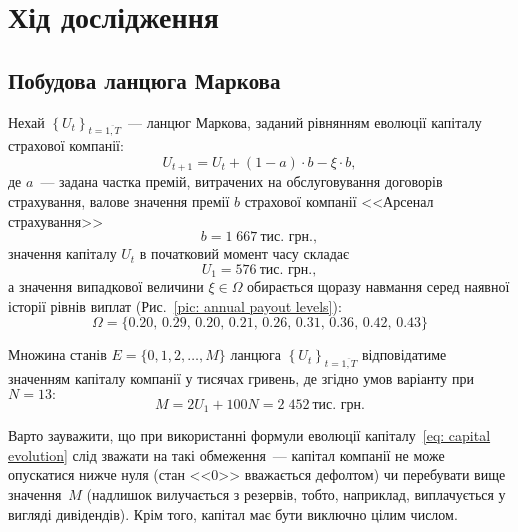 \documentclass{mathreport}
\begin{document}
\section*{Хід дослідження}

\subsection{Побудова ланцюга Маркова}

Нехай $\left\{ U_t \right\}_{t=\overline{1,T}}$~--- ланцюг Маркова, заданий рівнянням еволюції капіталу страхової компанії:
\begin{equation}\label{eq: capital evolution}
    U_{t+1} = U_{t} + (1-a) \cdot b - \xi \cdot b,
\end{equation}
де $a$~--- задана частка премій, витрачених на обслуговування договорів страхування, валове значення премії $b$ страхової компанії <<Арсенал страхування>>
\begin{equation}\label{eq: insurance premium value}
    b = 1\;667\ \text{тис. грн.},
\end{equation} 
значення капіталу $U_t$ в початковий момент часу складає
\begin{equation}\label{eq: initial (2022) capital}
    U_1 = 576\ \text{тис. грн.},
\end{equation}
а значення випадкової величини $\xi \in \Omega$ обирається щоразу навмання серед наявної історії рівнів виплат (Рис.~\ref{pic: annual payout levels}):
\begin{equation}\label{eq: annual payout levels}
    \Omega = \{ 0.20,\, 0.29,\, 0.20,\, 0.21,\, 0.26,\, 0.31,\, 0.36,\, 0.42,\, 0.43 \}
\end{equation}

Множина станів $E=\{ 0,1,2,\ldots,M \}$ ланцюга $\left\{ U_t \right\}_{t=\overline{1,T}}$ відповідатиме значенням капіталу компанії у тисячах гривень, де згідно умов варіанту при $N=13:$
\begin{equation}\label{eq: limit value of capital}
    M = 2U_1 + 100N = 2\;452\ \text{тис. грн.}
\end{equation}

Варто зауважити, що при використанні формули еволюції капіталу~\eqref{eq: capital evolution} слід зважати на такі обмеження~--- капітал компанії не може опускатися нижче нуля (стан <<0>> вважається дефолтом) чи перебувати вище значення~$M$ (надлишок вилучається з резервів, тобто, наприклад, виплачується у вигляді дивідендів). Крім того, капітал має бути виключно цілим числом.
\end{document}
